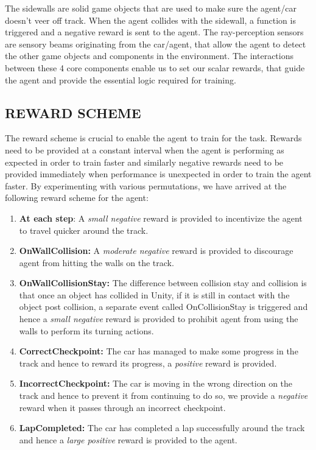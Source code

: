 The sidewalls are solid game objects that are used to make sure the agent/car doesn't veer off track. When the agent collides with the sidewall, a function is triggered and a negative reward is sent to the agent. The ray-perception sensors are sensory beams originating from the car/agent, that allow the agent to detect the other game objects and components in the environment. The interactions between these 4 core components enable us to set our scalar rewards, that guide the agent and provide the essential logic required for training.


\subsection{REWARD SCHEME}

The reward scheme is crucial to enable the agent to train for the task. Rewards need to be provided at a constant interval when the agent is performing as expected in order to train faster and similarly negative rewards need to be provided immediately when performance is unexpected in order to train the agent faster. By experimenting with various permutations, we have arrived at the following reward scheme for the agent:

\begin{enumerate}
    \item \textbf{At each step}: A \textit{small negative} reward is provided to incentivize the agent to travel quicker around the track.
    \item \textbf{OnWallCollision:} A \textit{moderate negative} reward is provided to discourage agent from hitting the walls on the track.
    \item \textbf{OnWallCollisionStay:} The difference between collision stay and collision is that once an object has collided in Unity, if it is still in contact with the object post collision, a separate event called OnCollisionStay is triggered and hence a \textit{small negative} reward is provided to prohibit agent from using the walls to perform its turning actions.
    \item \textbf{CorrectCheckpoint:} The car has managed to make some progress in the track and hence to reward its progress, a \textit{positive} reward is provided.
    \item \textbf{IncorrectCheckpoint:} The car is moving in the wrong direction on the track and hence to prevent it from continuing to do so, we provide a \textit{negative} reward when it passes through an incorrect checkpoint.
    \item \textbf{LapCompleted:} The car has completed a lap successfully around the track and hence a \textit{large positive} reward is provided to the agent.
\end{enumerate}


